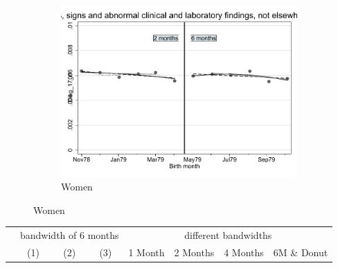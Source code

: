 \documentclass[a4paper ]{article}
\begin{document}
\begin{figure}[h]
\begin{subfigure}[t]{0.31\textwidth}
		\includegraphics[width=0.99\textwidth]{R1_RD_Diag_17_rf_fits}
		\caption{Women}
	\end{subfigure}
\end{figure}


\begin{table}[h]\centering
\def\sym#1{\ifmmode^{#1}\else\(^{#1}\)\fi}
\begin{tabular}{l*{3}{c}|cccc}
\toprule
&\multicolumn{3}{c}{bandwidth of 6 months} & \multicolumn{4}{c}{different bandwidths} \\
 \cmidrule(lr{1em}){2-4} \cmidrule(lr{1em}){5-8}
 &\multicolumn{1}{c}{(1)}&\multicolumn{1}{c}{(2)}&\multicolumn{1}{c}{(3)}& 1 Month & 2 Months & 4 Months & 6M \& Donut \\
\midrule 

\bottomrule
\end{tabular}
\end{table}
\end{document}
